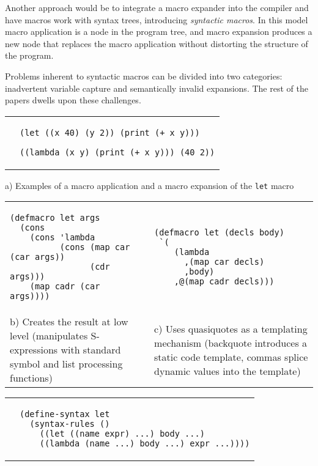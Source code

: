 \documentclass[10pt,journal,a4paper]{IEEEtran}
\begin{document}
Another approach would be to integrate a macro expander into the compiler and
have macros work with syntax trees, introducing \emph{syntactic macros}.
In this model macro application is a node in the program tree,
and macro expansion produces a new node that replaces the macro application
without distorting the structure of the program.

Problems inherent to syntactic macros can be divided into two categories:
inadvertent variable capture and semantically invalid expansions.
The rest of the papers dwells upon these challenges.

\begin{figure*}
\begin{listing}
\normalsize

\begin{tabular}{p{4.0cm} p{15cm}}\\
 &
\begin{verbatim}
(let ((x 40) (y 2)) (print (+ x y)))

((lambda (x y) (print (+ x y))) (40 2))
\end{verbatim}
\end{tabular}

\begin{center}
a) Examples of a macro application and a macro expansion of the \texttt{let} macro
\end{center}

\begin{tabular}{p{8.5cm} p{8.5cm}}\\
\begin{verbatim}
(defmacro let args
  (cons
    (cons 'lambda
          (cons (map car (car args))
                (cdr args)))
    (map cadr (car args))))
\end{verbatim}
&
\begin{verbatim}
(defmacro let (decls body)
 `(
    (lambda
      ,(map car decls)
      ,body)
    ,@(map cadr decls)))
\end{verbatim}\\
b) Creates the result at low level (manipulates S-expressions
with standard symbol and list processing functions)
&
c) Uses quasiquotes \cite{bawden99} as a templating mechanism
(backquote introduces a static code template, commas splice dynamic values
into the template)
\end{tabular}

\begin{tabular}{p{3.5cm} p{13.5cm}}\\
 &
\begin{verbatim}
(define-syntax let
  (syntax-rules ()
    ((let ((name expr) ...) body ...)
    ((lambda (name ...) body ...) expr ...))))
\end{verbatim}
\end{tabular}


\end{listing}
\end{figure*}
\end{document}
